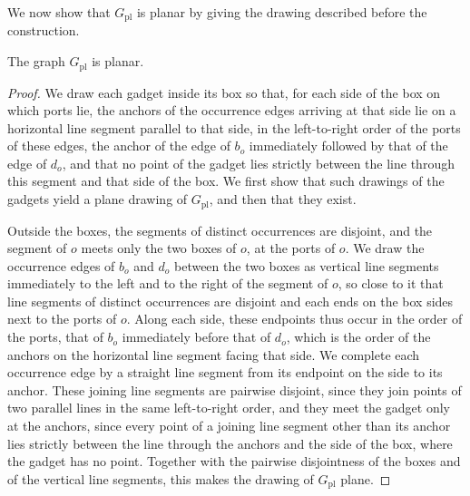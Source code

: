 \documentclass[a4paper,USenglish,thm-restate]{lipics-v2021}
\theoremstyle{problemstyle}
\begin{document}
We now show that $G_{\mathrm{pl}}$ is planar by giving the drawing
described before the construction.

\begin{lemma}\label{lem:planar}
The graph $G_{\mathrm{pl}}$ is planar.
\end{lemma}

\begin{proof}
We draw each gadget inside its box so that, for each side of
the box on which ports lie, the anchors of the occurrence edges arriving
at that side lie on a horizontal line segment parallel to that side, in
the left-to-right order of the ports of these edges, the anchor of the
edge of $b_o$ immediately followed by that of the edge of $d_o$, and that
no point of the gadget lies strictly between the line through this segment
and that side of the box. We first show that such
drawings of the gadgets yield a plane drawing of $G_{\mathrm{pl}}$, and
then that they exist.

Outside the boxes, the segments of distinct occurrences are disjoint, and
the segment of $o$ meets only the two boxes of $o$, at the ports of $o$.
We draw the occurrence edges of $b_o$ and $d_o$ between the two boxes as
vertical line segments immediately to the left and to the right of the
segment of $o$, so close to it that line segments of distinct occurrences
are disjoint and each ends on the box sides next to the ports of $o$.
Along each side, these endpoints thus occur in the order of the ports,
that of $b_o$ immediately before that of $d_o$, which is the order of the
anchors on the horizontal line segment facing that side. We complete each
occurrence edge by a straight line segment from its endpoint on the side
to its anchor. These joining line segments are pairwise disjoint, since
they join points of two parallel lines in the same left-to-right order,
and they meet the gadget only at the anchors, since every point of a
joining line segment other than its anchor lies strictly between the line
through the anchors and the side of the box, where the gadget has no point.
Together with the pairwise
disjointness of the boxes and of the vertical line segments, this makes
the drawing of $G_{\mathrm{pl}}$ plane.


\end{proof}
\end{document}
